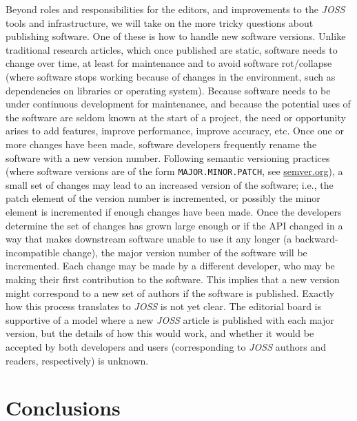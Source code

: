\documentclass{article}
\newcommand\joss{\textit{JOSS}}
\begin{document}
Beyond roles and responsibilities for the editors, and improvements to the \joss{} tools and infrastructure, we will take on the more tricky questions about publishing software.
One of these is how to handle new software versions.
Unlike traditional research articles, which once published are static, software needs to change
over time, at least for maintenance and to avoid software
rot\slash collapse (where software stops working because
of changes in the environment, such as dependencies on
libraries or operating system).
Because software needs to be under continuous development for
maintenance, and because the potential uses of the
software are seldom known at the start of a project,
the need or opportunity arises to add features, improve performance,
improve accuracy, etc. Once one or more changes have been made,
software developers frequently rename the software with a new
version number. Following semantic versioning practices (where software versions are of the form \texttt{MAJOR.MINOR.PATCH}, see \href{http://semver.org}{semver.org}), a small
set of changes may lead to an increased version of the software;
i.e., the patch element of the version number is incremented,
or possibly the minor element is incremented if enough changes have been made.
Once the developers determine the set of changes has
grown large enough or if the API changed in a way
that makes downstream software unable to use it any longer
(a backward-incompatible change), the major version number of
the software will be incremented.
Each change may be made by a different developer, who may be making their
first contribution to the software. This implies that a new version
might correspond to a new set of authors if the software is published.
Exactly how this process translates to \joss{} is not yet clear.
The editorial board is supportive of a model where a new \joss{} article is published with each major version, but
the details of how this would work, and whether it would be accepted
by both developers and users (corresponding to \joss{} authors and readers, respectively) is unknown.


\section{Conclusions}
\label{conclusions}
\end{document}
